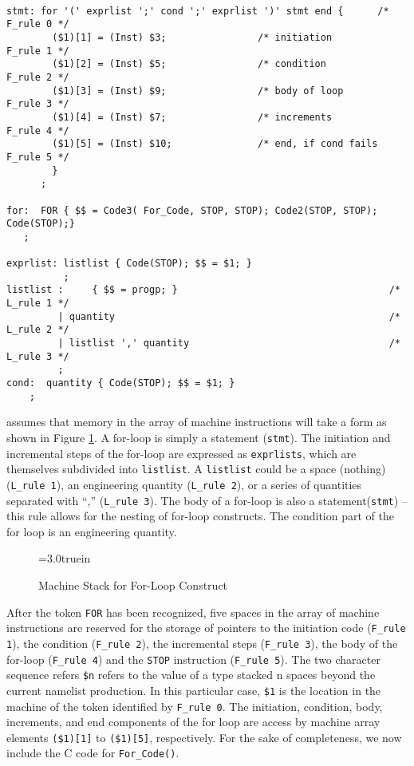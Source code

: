 \begin{footnotesize}
\begin{verbatim}

stmt: for '(' exprlist ';' cond ';' exprlist ')' stmt end {      /* F_rule 0 */
        ($1)[1] = (Inst) $3;                /* initiation           F_rule 1 */
        ($1)[2] = (Inst) $5;                /* condition            F_rule 2 */
        ($1)[3] = (Inst) $9;                /* body of loop         F_rule 3 */
        ($1)[4] = (Inst) $7;                /* increments           F_rule 4 */
        ($1)[5] = (Inst) $10;               /* end, if cond fails   F_rule 5 */
        }
      ;

for:  FOR { $$ = Code3( For_Code, STOP, STOP); Code2(STOP, STOP); Code(STOP);}
   ;

exprlist: listlist { Code(STOP); $$ = $1; }
          ;
listlist :     { $$ = progp; }                                     /* L_rule 1 */
         | quantity                                                /* L_rule 2 */
         | listlist ',' quantity                                   /* L_rule 3 */
         ;
cond:  quantity { Code(STOP); $$ = $1; }
    ;
\end{verbatim}
\end{footnotesize}

\vspace{0.15 in}\noindent
assumes that memory in the array of machine instructions will
take a form as shown in Figure \ref{fig: for_loop}.
A for-loop is simply a statement ({\tt stmt}).
The initiation and incremental steps of the for-loop are
expressed as {\tt exprlists}, which are themselves subdivided into {\tt listlist}.
A {\tt listlist} could be a space (nothing) ({\tt L\_rule 1}),
an engineering quantity ({\tt L\_rule 2}),
or a series of quantities separated with ``,'' ({\tt L\_rule 3}).
The body of a for-loop is also a statement({\tt stmt}) -- this
rule allows for the nesting of for-loop constructs.
The condition part of the for loop is an engineering quantity.

\begin{figure}[ht]
\epsfxsize=3.0truein
\centerline{} 
\caption{Machine Stack for For-Loop Construct}
\label{fig: for_loop}
\end{figure}

\vspace{0.15 in}
\noindent\hspace{0.50 in}
After the token {\tt FOR} has been recognized,
five spaces in the array of machine instructions are reserved
for the storage of pointers to the initiation code ({\tt F\_rule 1}),
the condition ({\tt F\_rule 2}),
the incremental steps ({\tt F\_rule 3}),
the body of the for-loop ({\tt F\_rule 4})
and the {\tt STOP} instruction ({\tt F\_rule 5}).
The two character sequence refers {\tt \$n} refers to the value
of a type stacked n spaces beyond the current namelist production.
In this particular case, {\tt \$1} is the location in the
machine of the token identified by {\tt F\_rule 0}.
The initiation, condition, body, increments, and end components of
the for loop are access by machine array elements
{\tt (\$1)[1]} to {\tt (\$1)[5]}, respectively.
For the sake of completeness, we now include the C code for {\tt For\_Code()}.

